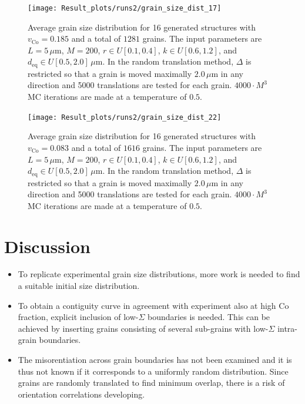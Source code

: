 \documentclass[10pt,a4paper]{article}
\begin{document}
\begin{figure}
	\begin{center}
		\texttt{[image: Result\_plots/runs2/grain\_size\_dist\_17]}
	\end{center}
	\caption{Average grain size distribution for 16 generated structures with $v_\text{Co} = 0.185$ and a total of $1281$ grains. The input parameters are $L=5 \, \mu\text{m}$, $M=200$, $r \in U[0.1, 0.4]$, $k \in U[0.6, 1.2]$, and $d_\text{eq} \in U[0.5, 2.0] \, \mu\text{m}$. In the random translation method, $\Delta$ is restricted so that a grain is moved maximally $2.0 \, \mu \text{m}$ in any direction and 5000 translations are tested for each grain. $4000 \cdot M^3$ MC iterations are made at a temperature of $0.5$.}
	\label{fig:microstructure_grain_size_dist_1}
\end{figure}

\begin{figure}
	\begin{center}
		\texttt{[image: Result\_plots/runs2/grain\_size\_dist\_22]}
	\end{center}
	\caption{Average grain size distribution for 16 generated structures with $v_\text{Co} = 0.083$ and a total of $1616$ grains. The input parameters are $L=5 \, \mu\text{m}$, $M=200$, $r \in U[0.1, 0.4]$, $k \in U[0.6, 1.2]$, and $d_\text{eq} \in U[0.5, 2.0] \, \mu\text{m}$. In the random translation method, $\Delta$ is restricted so that a grain is moved maximally $2.0 \, \mu \text{m}$ in any direction and 5000 translations are tested for each grain. $4000 \cdot M^3$ MC iterations are made at a temperature of $0.5$.}
	\label{fig:microstructure_grain_size_dist_2}
\end{figure}

\section{Discussion}

\begin{itemize}
	\item To replicate experimental grain size distributions, more work is needed to find a suitable initial size distribution.
	\item To obtain a contiguity curve in agreement with experiment also at high Co fraction, explicit inclusion of low-$\Sigma$ boundaries is needed. This can be achieved by inserting grains consisting of several sub-grains with low-$\Sigma$ intra-grain boundaries.
	\item The misorentiation across grain boundaries has not been examined and it is thus not known if it corresponds to a uniformly random distribution. Since grains are randomly translated to find minimum overlap, there is a risk of orientation correlations developing.
\end{itemize}
\end{document}
